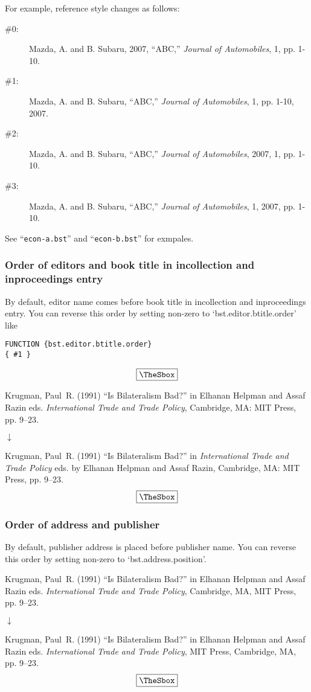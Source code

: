 \documentclass[10pt]{article}
\newenvironment{Frame}%
{\setlength{\fboxsep}{15pt}
\setlength{\mylength}{\linewidth}%
\addtolength{\mylength}{-2\fboxsep}%
\addtolength{\mylength}{-2\fboxrule}%
\Sbox
\minipage{\mylength}%
\setlength{\abovedisplayskip}{0pt}%
\setlength{\belowdisplayskip}{0pt}%
}%
{\endminipage\endSbox
\[\fbox{\TheSbox}\]}
\begin{document}
For example, reference style changes as follows:
\begin{description}
 \item[\#0: ] Mazda, A. and B. Subaru, 2007, ``ABC,'' \textit{Journal of Automobiles}, 1, pp. 1-10.
 \item[\#1: ] Mazda, A. and B. Subaru, ``ABC,'' \textit{Journal of Automobiles}, 1, pp. 1-10, 2007.
 \item[\#2: ] Mazda, A. and B. Subaru, ``ABC,'' \textit{Journal of Automobiles}, 2007, 1, pp. 1-10.
 \item[\#3: ] Mazda, A. and B. Subaru, ``ABC,'' \textit{Journal of Automobiles}, 1, 2007, pp. 1-10.
\end{description}

See ``\texttt{econ-a.bst}'' and ``\texttt{econ-b.bst}'' for exmpales.


\subsubsection{Order of editors and book title in incollection and inproceedings entry}

By default, editor name comes before book title in incollection and
inproceedings entry. You can reverse this order by
setting non-zero to `bst.editor.btitle.order' like
\begin{Frame}
\begin{verbatim}
FUNCTION {bst.editor.btitle.order}
{ #1 }
\end{verbatim}
\end{Frame}


\begin{Frame}
Krugman, Paul~R. (1991) ``Is Bilateralism Bad?'' in Elhanan Helpman and Assaf
  Razin eds.  {\it International Trade and Trade Policy}, Cambridge, MA: MIT
  Press, pp. 9--23.
\begin{center}
 $\downarrow$
\end{center} 
Krugman, Paul~R. (1991) ``Is Bilateralism Bad?'' in  {\it International Trade
and Trade Policy}  eds. by Elhanan Helpman and Assaf Razin, Cambridge, MA:
MIT Press, pp. 9--23.
\end{Frame}

\subsubsection{Order of address and publisher}

By default, publisher address is placed before publisher name.  You can
reverse this order by setting non-zero to `bst.address.position'.
\begin{Frame}
Krugman, Paul~R. (1991) ``Is Bilateralism Bad?'' in Elhanan Helpman and
  Assaf Razin eds.  {\it International Trade and Trade Policy},
  Cambridge, MA, MIT Press, pp. 9--23.
\begin{center}
 $\downarrow$
\end{center} 
Krugman, Paul~R. (1991) ``Is Bilateralism Bad?'' in Elhanan Helpman and Assaf
  Razin eds.   {\it International Trade and Trade Policy}, MIT Press,
  Cambridge, MA, pp. 9--23.
\end{Frame}
\end{document}

